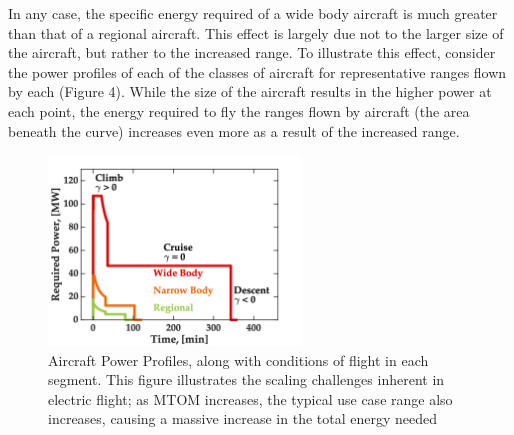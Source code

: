\documentclass{achemso}
\begin{document}
In any case, the specific energy required of a wide body aircraft is much greater than that of a regional aircraft. This effect is largely due not to the larger size of the aircraft, but rather to the increased range. To illustrate this effect, consider the power profiles of each of the classes of aircraft for representative ranges flown by each (Figure 4). While the size of the aircraft results in the higher power at each point, the energy required to fly the ranges flown by aircraft (the area beneath the curve) increases even more as a result of the increased range. 

\begin{figure}[htp]
\centering
\includegraphics[width=0.6\textwidth]{Figures/powerprofiles.png}
\caption{Aircraft Power Profiles, along with conditions of flight in each segment. This figure illustrates the scaling challenges inherent in electric flight; as MTOM increases, the typical use case range also increases, causing a massive increase in the total energy needed}
\label{fig:figure4}
\end{figure}
\end{document}
